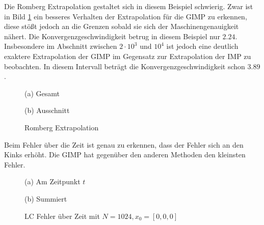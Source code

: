 Die Romberg Extrapolation gestaltet sich in diesem Beispiel schwierig. Zwar ist in Bild \ref{fig:lcRomberg} ein besseres Verhalten der Extrapolation für die GIMP zu erkennen, diese stößt jedoch an die Grenzen sobald sie sich der Maschinengenauigkeit nähert.  Die Konvergenzgeschwindigkeit betrug in diesem Beispiel nur $2.24$. Insbesondere im Abschnitt zwischen $2\cdot 10^{3}$ und $10^4$ ist jedoch eine deutlich exaktere Extrapolation der GIMP im Gegensatz zur Extrapolation der IMP zu beobachten. In diesem Intervall beträgt die Konvergenzgeschwindigkeit schon $3.89$. 
\begin{figure}[H]
\footnotesize 
\centering
\begin{minipage}[b]{0.49\linewidth}

\caption*{(a) Gesamt}
\end{minipage}
\begin{minipage}[b]{0.49\linewidth}

\caption*{(b) Ausschnitt}
\end{minipage}
\caption{Romberg Extrapolation}
\label{fig:lcRomberg}
\end{figure}



Beim Fehler über die Zeit ist genau zu erkennen, dass der Fehler sich an den Kinks erhöht. Die GIMP hat gegenüber den anderen Methoden den kleinsten Fehler. 
\begin{figure}[H]
\footnotesize 
\centering
\begin{minipage}[b]{0.49\linewidth}

\caption*{(a) Am Zeitpunkt $t$}
\end{minipage}
\begin{minipage}[b]{0.49\linewidth}

\caption*{(b) Summiert}
\end{minipage}
\caption{LC Fehler über Zeit mit $N =1024 ,x_0 = [0,0,0]$}
\end{figure}
